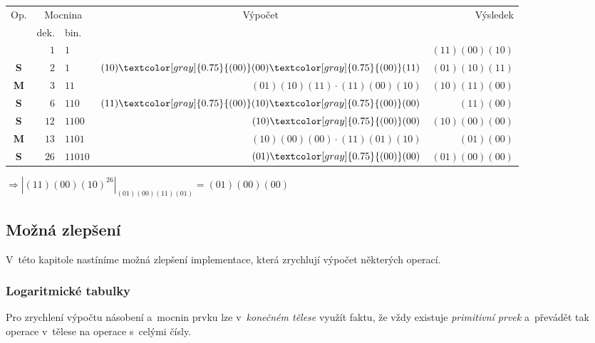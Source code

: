 \documentclass[thesis=M,czech,hidelinks]{FITthesis}[2012/06/26]
\newcommand{\0}{{\textcolor[gray]{0.75}{0}}}
\begin{document}
\renewcommand{\0}{{\textcolor[gray]{0.75}{(00)}}}
\begin{center}
    \begin{tabular}{c|r|l|r|r}
        \multirow{2}{*}{Op.} & \multicolumn{2}{c}{Mocnina} & \multicolumn{1}{c}{\multirow{2}{*}{Výpočet}} & \multirow{2}{*}{Výsledek} \\
                &  dek. & bin.    &                                     &                \\
        \hline
        \hline
                & $  1$ & $1    $ &                                     & $(11)(00)(10)$ \\
        \hline
    \textbf{S}  & $  2$ & $1    $ & $                (10)\0(00)\0(11) $ & $(01)(10)(11)$ \\
    \textbf{M}  & $  3$ & $11   $ & $ (01)(10)(11) \cdot (11)(00)(10) $ & $(10)(11)(00)$ \\
        \hline
    \textbf{S}  & $  6$ & $110  $ & $                (11)\0(10)\0(00) $ & $    (11)(00)$ \\
        \hline
    \textbf{S}  & $ 12$ & $1100 $ & $                      (10)\0(00) $ & $(10)(00)(00)$ \\
    \textbf{M}  & $ 13$ & $1101 $ & $ (10)(00)(00) \cdot (11)(01)(10) $ & $    (01)(00)$ \\
        \hline
    \textbf{S}  & $ 26$ & $11010$ & $                      (01)\0(00) $ & $(01)(00)(00)$ \\
    \end{tabular}
\end{center}
$
    \Rightarrow
    \left| (11)(00)(10)^{26} \right|_{(01)(00)(11)(01)} = (01)(00)(00)
$

\subsection{Možná zlepšení}

V~této kapitole nastíníme možná zlepšení implementace, která zrychlují
výpočet některých operací.


\subsubsection{Logaritmické tabulky}

Pro zrychlení výpočtu násobení a~mocnin prvku lze v~\emph{konečném tělese}
využít faktu, že vždy existuje \emph{primitivní prvek} a~převádět tak operace
v~tělese na operace s~celými čísly.
\end{document}
